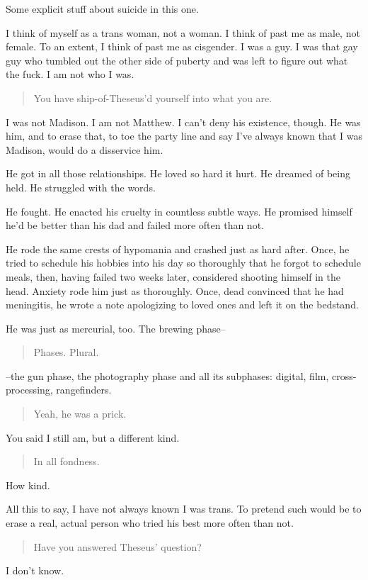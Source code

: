 Some explicit stuff about suicide in this one.

I think of myself as a trans woman, not a woman. I think of past me as male, not female. To an extent, I think of past me as cisgender. I was a guy. I was that gay guy who tumbled out the other side of puberty and was left to figure out what the fuck. I am not who I was.

\begin{quote}
You have ship-of-Theseus'd yourself into what you are.
\end{quote}

I was not Madison. I am not Matthew. I can't deny his existence, though. He was him, and to erase that, to toe the party line and say I've always known that I was Madison, would do a disservice him.

He got in all those relationships. He loved so hard it hurt. He dreamed of being held. He struggled with the words.

He fought. He enacted his cruelty in countless subtle ways. He promised himself he'd be better than his dad and failed more often than not.

He rode the same crests of hypomania and crashed just as hard after. Once, he tried to schedule his hobbies into his day so thoroughly that he forgot to schedule meals, then, having failed two weeks later, considered shooting himself in the head. Anxiety rode him just as thoroughly. Once, dead convinced that he had meningitis, he wrote a note apologizing to loved ones and left it on the bedstand.

He was just as mercurial, too. The brewing phase--

\begin{quote}
Phases. Plural.
\end{quote}

--the gun phase, the photography phase and all its subphases: digital, film, cross-processing, rangefinders.

\begin{quote}
Yeah, he was a prick.
\end{quote}

You said I still am, but a different kind.

\begin{quote}
In all fondness.
\end{quote}

How kind.

All this to say, I have not always known I was trans. To pretend such would be to erase a real, actual person who tried his best more often than not.

\begin{quote}
Have you answered Theseus' question?
\end{quote}

I don't know.
